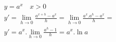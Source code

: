 \begin{ex}
\begin{align}
&y=a^x\quad x>0\nonumber\\
&y'=\lim_{h\rightarrow 0} \frac{a^{x+h}-a^x}{h}=\lim_{h\rightarrow 0 } \frac{a^x.a^h-a^x}{h}=\nonumber\\
&y'=a^x.\lim_{h\rightarrow 0} \frac{a^h-1}{h}=a^x.\ln{a}\nonumber
\end{align}
\end{ex}